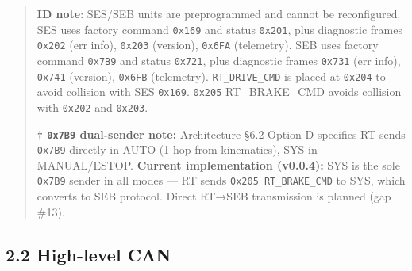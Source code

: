 \begin{quote}
\textbf{ID note}: SES/SEB units are preprogrammed and cannot be reconfigured.
SES uses factory command \texttt{0x169} and status \texttt{0x201}, plus
diagnostic frames \texttt{0x202} (err info), \texttt{0x203} (version),
\texttt{0x6FA} (telemetry). SEB uses factory command \texttt{0x7B9} and status
\texttt{0x721}, plus diagnostic frames \texttt{0x731} (err info), \texttt{0x741}
(version), \texttt{0x6FB} (telemetry). \texttt{RT\_DRIVE\_CMD} is placed at
\texttt{0x204} to avoid collision with SES \texttt{0x169}. \texttt{0x205}
RT\_BRAKE\_CMD avoids collision with \texttt{0x202} and \texttt{0x203}.

\textbf{† \texttt{0x7B9} dual-sender note:} Architecture §6.2 Option D specifies
RT sends \texttt{0x7B9} directly in AUTO (1-hop from kinematics), SYS in
MANUAL/ESTOP. \textbf{Current implementation (v0.0.4):} SYS is the sole
\texttt{0x7B9} sender in all modes --- RT sends \texttt{0x205\ RT\_BRAKE\_CMD}
to SYS, which converts to SEB protocol. Direct RT→SEB transmission is planned
(gap \#13).
\end{quote}

\subsection{2.2 High-level CAN}\label{high-level-can}

